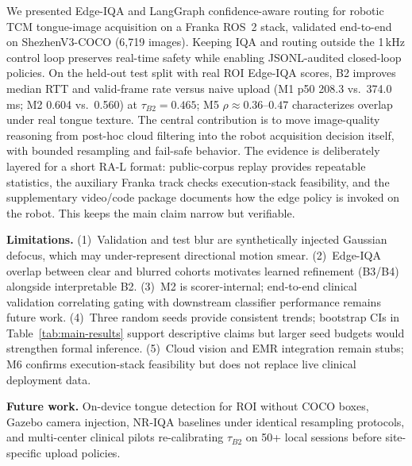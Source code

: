 We presented Edge-IQA and LangGraph confidence-aware routing for robotic TCM tongue-image acquisition on a Franka ROS~2 stack, validated end-to-end on ShezhenV3-COCO (6{,}719 images).
Keeping IQA and routing outside the 1\,kHz control loop preserves real-time safety while enabling JSONL-audited closed-loop policies.
On the held-out test split with real ROI Edge-IQA scores, B2 improves median RTT and valid-frame rate versus naive upload (M1 p50 208.3 vs.\ 374.0\,ms; M2 0.604 vs.\ 0.560) at $\tau_{B2}{=}0.465$; M5 $\rho{\approx}0.36$--$0.47$ characterizes overlap under real tongue texture.
The central contribution is to move image-quality reasoning from post-hoc cloud filtering into the robot acquisition decision itself, with bounded resampling and fail-safe behavior.
The evidence is deliberately layered for a short RA-L format: public-corpus replay provides repeatable statistics, the auxiliary Franka track checks execution-stack feasibility, and the supplementary video/code package documents how the edge policy is invoked on the robot.
This keeps the main claim narrow but verifiable.

\textbf{Limitations.} (1)~Validation and test blur are synthetically injected Gaussian defocus, which may under-represent directional motion smear.
(2)~Edge-IQA overlap between clear and blurred cohorts motivates learned refinement (B3/B4) alongside interpretable B2.
(3)~M2 is scorer-internal; end-to-end clinical validation correlating gating with downstream classifier performance remains future work.
(4)~Three random seeds provide consistent trends; bootstrap CIs in Table~\ref{tab:main-results} support descriptive claims but larger seed budgets would strengthen formal inference.
(5)~Cloud vision and EMR integration remain stubs; M6 confirms execution-stack feasibility but does not replace live clinical deployment data.

\textbf{Future work.} On-device tongue detection for ROI without COCO boxes, Gazebo camera injection, NR-IQA baselines under identical resampling protocols, and multi-center clinical pilots re-calibrating $\tau_{B2}$ on 50+ local sessions before site-specific upload policies.
